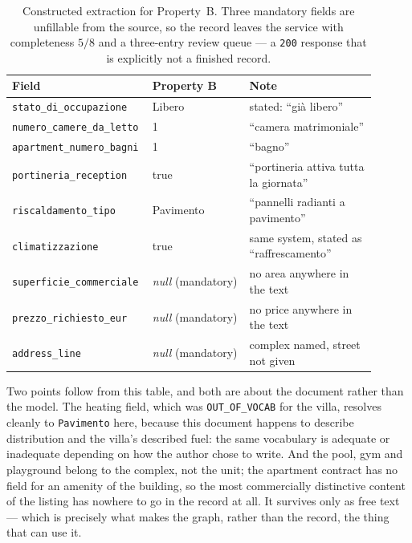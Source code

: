 \begin{table}[htbp]
\centering
\small
\begin{tabular}{p{0.30\linewidth}p{0.26\linewidth}p{0.34\linewidth}}
\hline
\textbf{Field} & \textbf{Property B} & \textbf{Note} \\
\hline
\footnotesize{\texttt{stato\_di\_occupazione}} & Libero & stated: ``già libero'' \\
\footnotesize{\texttt{numero\_camere\_da\_letto}} & 1 & ``camera matrimoniale'' \\
\footnotesize{\texttt{apartment\_numero\_bagni}} & 1 & ``bagno'' \\
\footnotesize{\texttt{portineria\_reception}} & true & ``portineria attiva tutta la giornata'' \\
\footnotesize{\texttt{riscaldamento\_tipo}} & Pavimento & ``pannelli radianti a pavimento'' \\
\footnotesize{\texttt{climatizzazione}} & true & same system, stated as ``raffrescamento'' \\
\footnotesize{\texttt{superficie\_commerciale}} & \emph{null} (mandatory) & no area anywhere in the text \\
\footnotesize{\texttt{prezzo\_richiesto\_eur}} & \emph{null} (mandatory) & no price anywhere in the text \\
\footnotesize{\texttt{address\_line}} & \emph{null} (mandatory) & complex named, street not given \\
\hline
\end{tabular}
\caption{Constructed extraction for Property~B. Three mandatory fields are unfillable from the source, so the record leaves the service with completeness $5/8$ and a three-entry review queue --- a \texttt{200} response that is explicitly not a finished record.}
\label{tab:property-b-record}
\end{table}

Two points follow from this table, and both are about the document rather than the model. The heating field, which was \texttt{OUT\_OF\_VOCAB} for the villa, resolves cleanly to \texttt{Pavimento} here, because this document happens to describe distribution and the villa's described fuel: the same vocabulary is adequate or inadequate depending on how the author chose to write. And the pool, gym and playground belong to the complex, not the unit; the apartment contract has no field for an amenity of the building, so the most commercially distinctive content of the listing has nowhere to go in the record at all. It survives only as free text --- which is precisely what makes the graph, rather than the record, the thing that can use it.

